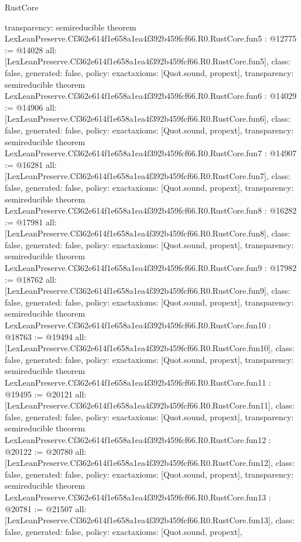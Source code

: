 \begin{lexlean}{RustCore}
\begin{coremodule}
{  transparency: semireducible
}
theorem LexLeanPreserve.Cf362e614f1e658a1ea4f392b459fcf66.R0.RustCore.fun5 : @12775 := @14028 {
  all: [LexLeanPreserve.Cf362e614f1e658a1ea4f392b459fcf66.R0.RustCore.fun5],
  class: false,
  generated: false,
  policy: exact{axioms: [Quot.sound, propext]},
  transparency: semireducible
}
theorem LexLeanPreserve.Cf362e614f1e658a1ea4f392b459fcf66.R0.RustCore.fun6 : @14029 := @14906 {
  all: [LexLeanPreserve.Cf362e614f1e658a1ea4f392b459fcf66.R0.RustCore.fun6],
  class: false,
  generated: false,
  policy: exact{axioms: [Quot.sound, propext]},
  transparency: semireducible
}
theorem LexLeanPreserve.Cf362e614f1e658a1ea4f392b459fcf66.R0.RustCore.fun7 : @14907 := @16281 {
  all: [LexLeanPreserve.Cf362e614f1e658a1ea4f392b459fcf66.R0.RustCore.fun7],
  class: false,
  generated: false,
  policy: exact{axioms: [Quot.sound, propext]},
  transparency: semireducible
}
theorem LexLeanPreserve.Cf362e614f1e658a1ea4f392b459fcf66.R0.RustCore.fun8 : @16282 := @17981 {
  all: [LexLeanPreserve.Cf362e614f1e658a1ea4f392b459fcf66.R0.RustCore.fun8],
  class: false,
  generated: false,
  policy: exact{axioms: [Quot.sound, propext]},
  transparency: semireducible
}
theorem LexLeanPreserve.Cf362e614f1e658a1ea4f392b459fcf66.R0.RustCore.fun9 : @17982 := @18762 {
  all: [LexLeanPreserve.Cf362e614f1e658a1ea4f392b459fcf66.R0.RustCore.fun9],
  class: false,
  generated: false,
  policy: exact{axioms: [Quot.sound, propext]},
  transparency: semireducible
}
theorem LexLeanPreserve.Cf362e614f1e658a1ea4f392b459fcf66.R0.RustCore.fun10 : @18763 := @19494 {
  all: [LexLeanPreserve.Cf362e614f1e658a1ea4f392b459fcf66.R0.RustCore.fun10],
  class: false,
  generated: false,
  policy: exact{axioms: [Quot.sound, propext]},
  transparency: semireducible
}
theorem LexLeanPreserve.Cf362e614f1e658a1ea4f392b459fcf66.R0.RustCore.fun11 : @19495 := @20121 {
  all: [LexLeanPreserve.Cf362e614f1e658a1ea4f392b459fcf66.R0.RustCore.fun11],
  class: false,
  generated: false,
  policy: exact{axioms: [Quot.sound, propext]},
  transparency: semireducible
}
theorem LexLeanPreserve.Cf362e614f1e658a1ea4f392b459fcf66.R0.RustCore.fun12 : @20122 := @20780 {
  all: [LexLeanPreserve.Cf362e614f1e658a1ea4f392b459fcf66.R0.RustCore.fun12],
  class: false,
  generated: false,
  policy: exact{axioms: [Quot.sound, propext]},
  transparency: semireducible
}
theorem LexLeanPreserve.Cf362e614f1e658a1ea4f392b459fcf66.R0.RustCore.fun13 : @20781 := @21507 {
  all: [LexLeanPreserve.Cf362e614f1e658a1ea4f392b459fcf66.R0.RustCore.fun13],
  class: false,
  generated: false,
  policy: exact{axioms: [Quot.sound, propext]},
}
\end{coremodule}
\end{lexlean}
